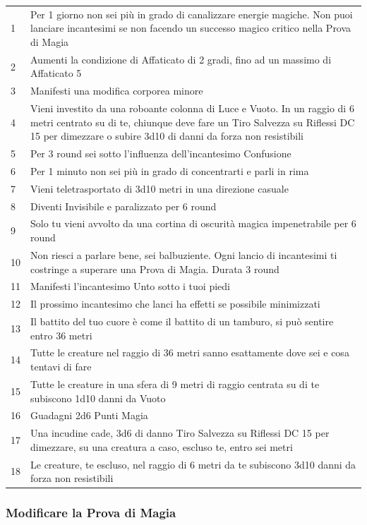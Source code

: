 \begin{multicols}{2}
\noindent\begin{tabularx}{0.5\textwidth}{l|X}
\hline
1 & Per 1 giorno non sei più in grado di canalizzare energie magiche. Non puoi lanciare incantesimi se non facendo un successo magico critico nella Prova di Magia\\
2 & Aumenti la condizione di Affaticato di 2 gradi, fino ad un massimo di Affaticato 5\\
3 & Manifesti una modifica corporea minore\\
4 & Vieni investito da una roboante colonna di Luce e Vuoto. In un raggio di 6 metri centrato su di te, chiunque deve fare un Tiro Salvezza su Riflessi DC 15 per dimezzare o subire 3d10 di danni da forza non resistibili\\
5 & Per 3 round sei sotto l'influenza dell'incantesimo Confusione\\
6 & Per 1 minuto non sei più in grado di concentrarti e parli in rima\\
7 & Vieni teletrasportato di 3d10 metri in una direzione casuale\\
8 & Diventi Invisibile e paralizzato per 6 round\\
9 & Solo tu vieni avvolto da una cortina di oscurità magica impenetrabile per 6 round\\
10 & Non riesci a parlare bene, sei balbuziente. Ogni lancio di incantesimi ti costringe a superare una Prova di Magia. Durata 3 round\\
11 & Manifesti l'incantesimo Unto sotto i tuoi piedi\\
12 & Il prossimo incantesimo che lanci ha effetti se possibile minimizzati\\
13 & Il battito del tuo cuore è come il battito di un tamburo, si può sentire entro 36 metri\\
14 & Tutte le creature nel raggio di 36 metri sanno esattamente dove sei e cosa tentavi di fare\\
15 & Tutte le creature in una sfera di 9 metri di raggio centrata su di te subiscono 1d10 danni da Vuoto\\
16 & Guadagni 2d6 Punti Magia\\
17 & Una incudine cade, 3d6 di danno Tiro Salvezza su Riflessi DC 15 per dimezzare, su una creatura a caso, escluso te, entro sei metri\\
18 & Le creature, te escluso, nel raggio di 6 metri da te subiscono 3d10 danni da forza non resistibili
\end{tabularx}

\subsubsection{Modificare la Prova di Magia}


\end{multicols}
